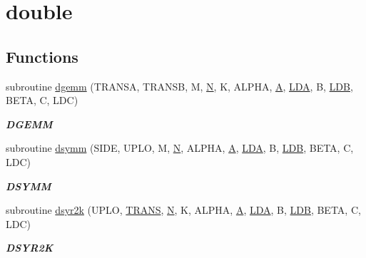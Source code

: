\hypertarget{group__double__blas__level3}{}\section{double}
\label{group__double__blas__level3}
\subsection*{Functions}
\begin{DoxyCompactItemize}
\item 
subroutine \hyperlink{group__double__blas__level3_gaeda3cbd99c8fb834a60a6412878226e1}{dgemm} (T\+R\+A\+N\+S\+A, T\+R\+A\+N\+S\+B, M, \hyperlink{polmisc_8c_a0240ac851181b84ac374872dc5434ee4}{N}, K, A\+L\+P\+H\+A, \hyperlink{classA}{A}, \hyperlink{example__user_8c_ae946da542ce0db94dced19b2ecefd1aa}{L\+D\+A}, B, \hyperlink{example__user_8c_a50e90a7104df172b5a89a06c47fcca04}{L\+D\+B}, B\+E\+T\+A, C, L\+D\+C)
\begin{DoxyCompactList}\small\item\em {\bfseries D\+G\+E\+M\+M} \end{DoxyCompactList}\item 
subroutine \hyperlink{group__double__blas__level3_ga253c8edb8b21d1b5b1783725c2a6b692}{dsymm} (S\+I\+D\+E, U\+P\+L\+O, M, \hyperlink{polmisc_8c_a0240ac851181b84ac374872dc5434ee4}{N}, A\+L\+P\+H\+A, \hyperlink{classA}{A}, \hyperlink{example__user_8c_ae946da542ce0db94dced19b2ecefd1aa}{L\+D\+A}, B, \hyperlink{example__user_8c_a50e90a7104df172b5a89a06c47fcca04}{L\+D\+B}, B\+E\+T\+A, C, L\+D\+C)
\begin{DoxyCompactList}\small\item\em {\bfseries D\+S\+Y\+M\+M} \end{DoxyCompactList}\item 
subroutine \hyperlink{group__double__blas__level3_ga51f6c38a43599163e670f0f6f5645587}{dsyr2k} (U\+P\+L\+O, \hyperlink{superlu__enum__consts_8h_a0c4e17b2d5cea33f9991ccc6a6678d62a1f61e3015bfe0f0c2c3fda4c5a0cdf58}{T\+R\+A\+N\+S}, \hyperlink{polmisc_8c_a0240ac851181b84ac374872dc5434ee4}{N}, K, A\+L\+P\+H\+A, \hyperlink{classA}{A}, \hyperlink{example__user_8c_ae946da542ce0db94dced19b2ecefd1aa}{L\+D\+A}, B, \hyperlink{example__user_8c_a50e90a7104df172b5a89a06c47fcca04}{L\+D\+B}, B\+E\+T\+A, C, L\+D\+C)
\begin{DoxyCompactList}\small\item\em {\bfseries D\+S\+Y\+R2\+K} \end{DoxyCompactList}\item 

\end{DoxyCompactItemize}
